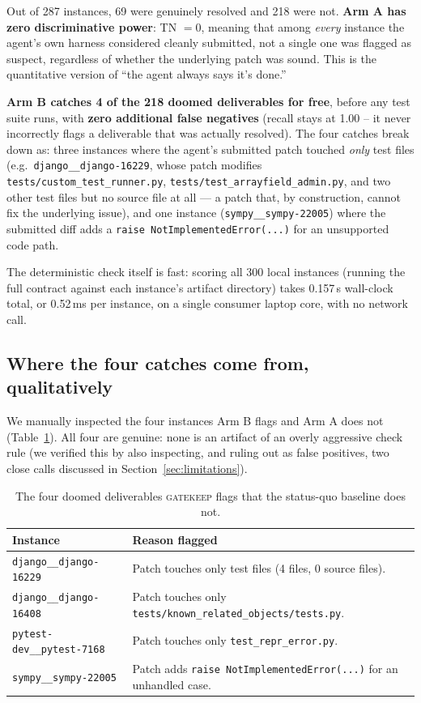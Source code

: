 \documentclass{article}
\begin{document}
Out of 287 instances, 69 were genuinely resolved and 218 were not.
\textbf{Arm A has zero discriminative power}: TN $=0$, meaning that among
\emph{every} instance the agent's own harness considered cleanly submitted,
not a single one was flagged as suspect, regardless of whether the
underlying patch was sound. This is the quantitative version of ``the
agent always says it's done.''

\textbf{Arm B catches 4 of the 218 doomed deliverables for free}, before
any test suite runs, with \textbf{zero additional false negatives}
(recall stays at 1.00 -- it never incorrectly flags a deliverable that
was actually resolved). The four catches break down as: three instances
where the agent's submitted patch touched \emph{only} test files (e.g.\
\texttt{django\_\_django-16229}, whose patch modifies
\texttt{tests/custom\_test\_runner.py}, \texttt{tests/test\_arrayfield\_\allowbreak admin.py}, and two other test files but no source file at all
--- a patch that, by construction, cannot fix the underlying issue), and
one instance (\texttt{sympy\_\_sympy-22005}) where the submitted diff adds
a \texttt{raise NotImplementedError(...)} for an unsupported code path.

The deterministic check itself is fast: scoring all 300 local instances
(running the full contract against each instance's artifact directory)
takes 0.157\,s wall-clock total, or 0.52\,ms per instance, on a single
consumer laptop core, with no network call.

\subsection{Where the four catches come from, qualitatively}

We manually inspected the four instances Arm B flags and Arm A does not
(Table~\ref{tab:catches}). All four are genuine: none is an artifact of an
overly aggressive check rule (we verified this by also inspecting, and
ruling out as false positives, two close calls discussed in
Section~\ref{sec:limitations}).

\begin{table}[h]
  \caption{The four doomed deliverables \textsc{gatekeep} flags that the
  status-quo baseline does not.}
  \label{tab:catches}
  \centering
  \small
  \begin{tabular}{lp{8.7cm}}
    \toprule
    Instance & Reason flagged \\
    \midrule
    \texttt{django\_\_django-16229} & Patch touches only test files (4 files, 0 source files). \\
    \texttt{django\_\_django-16408} & Patch touches only \texttt{tests/known\_related\_objects/tests.py}. \\
    \texttt{pytest-dev\_\_pytest-7168} & Patch touches only \texttt{test\_repr\_error.py}. \\
    \texttt{sympy\_\_sympy-22005} & Patch adds \texttt{raise NotImplementedError(...)} for an unhandled case. \\
    \bottomrule
  \end{tabular}
\end{table}
\end{document}
